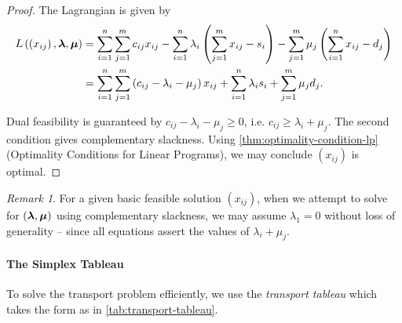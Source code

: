 \documentclass[11pt]{article}
\theoremstyle{definition}
\theoremstyle{remark}
\newtheorem{remark}[theorem]{Remark}
\newcommand{\pqty}[1]{\left(#1\right)}
\begin{document}
\begin{proof}
    The Lagrangian is given by
    \begin{align*}
        L\pqty{\pqty{x_{ij}}, \vb*{\lambda}, \vb*{\mu}} &= \sum_{i = 1}^{n} \sum_{j = 1}^{m} c_{ij} x_{ij} - \sum_{i = 1}^{n} \lambda_i \pqty{\sum_{j = 1}^{m} x_{ij} - s_i} - \sum_{j = 1}^{m} \mu_j \pqty{\sum_{i = 1}^{n} x_{ij} - d_j} \\
        &= \sum_{i = 1}^{n} \sum_{j = 1}^{m} \pqty{c_{ij} - \lambda_i - \mu_j} x_{ij} + \sum_{i = 1}^{n} \lambda_i s_i + \sum_{j = 1}^{m} \mu_j d_j.
    \end{align*}

    Dual feasibility is guaranteed by \(c_{ij} - \lambda_i - \mu_j \geq 0\), i.e. \(c_{ij} \geq \lambda_i + \mu_j\). The second condition gives complementary slackness. Using \autoref{thm:optimality-condition-lp} (Optimality Conditions for Linear Programs), we may conclude \(\pqty{x_{ij}}\) is optimal.
\end{proof}

\begin{remark}\label{optim-unit-0074}
    For a given basic feasible solution \(\pqty{x_{ij}}\), when we attempt to solve for \(\pqty{\vb*{\lambda}, \vb*{\mu}}\) using complementary slackness, we may assume \(\lambda_1 = 0\) without loss of generality -- since all equations assert the values of \(\lambda_i + \mu_j\).
\end{remark}

\paragraph{The Simplex Tableau}

To solve the transport problem efficiently, we use the \emph{transport tableau} which takes the form as in \autoref{tab:transport-tableau}.
\end{document}
